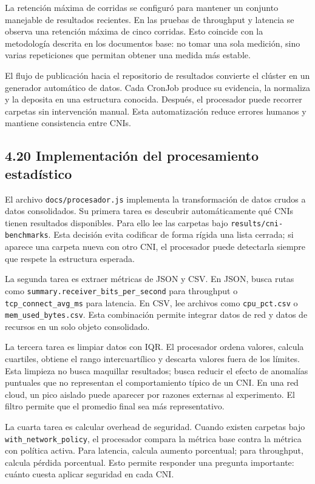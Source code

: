 La retención máxima de corridas se configuró para mantener un conjunto manejable de resultados recientes. En las pruebas de throughput y latencia se observa una retención máxima de cinco corridas. Esto coincide con la metodología descrita en los documentos base: no tomar una sola medición, sino varias repeticiones que permitan obtener una medida más estable.

El flujo de publicación hacia el repositorio de resultados convierte el clúster en un generador automático de datos. Cada CronJob produce su evidencia, la normaliza y la deposita en una estructura conocida. Después, el procesador puede recorrer carpetas sin intervención manual. Esta automatización reduce errores humanos y mantiene consistencia entre CNIs.

\subsection{4.20 Implementación del procesamiento estadístico}

El archivo \texttt{docs/procesador.js} implementa la transformación de datos crudos a datos consolidados. Su primera tarea es descubrir automáticamente qué CNIs tienen resultados disponibles. Para ello lee las carpetas bajo \texttt{results/cni-benchmarks}. Esta decisión evita codificar de forma rígida una lista cerrada; si aparece una carpeta nueva con otro CNI, el procesador puede detectarla siempre que respete la estructura esperada.

La segunda tarea es extraer métricas de JSON y CSV. En JSON, busca rutas como \texttt{summary.receiver\_bits\_per\_second} para throughput o \texttt{tcp\_connect\_avg\_ms} para latencia. En CSV, lee archivos como \texttt{cpu\_pct.csv} o \texttt{mem\_used\_bytes.csv}. Esta combinación permite integrar datos de red y datos de recursos en un solo objeto consolidado.

La tercera tarea es limpiar datos con IQR. El procesador ordena valores, calcula cuartiles, obtiene el rango intercuartílico y descarta valores fuera de los límites. Esta limpieza no busca maquillar resultados; busca reducir el efecto de anomalías puntuales que no representan el comportamiento típico de un CNI. En una red cloud, un pico aislado puede aparecer por razones externas al experimento. El filtro permite que el promedio final sea más representativo.

La cuarta tarea es calcular overhead de seguridad. Cuando existen carpetas bajo \texttt{with\_network\_policy}, el procesador compara la métrica base contra la métrica con política activa. Para latencia, calcula aumento porcentual; para throughput, calcula pérdida porcentual. Esto permite responder una pregunta importante: cuánto cuesta aplicar seguridad en cada CNI.

